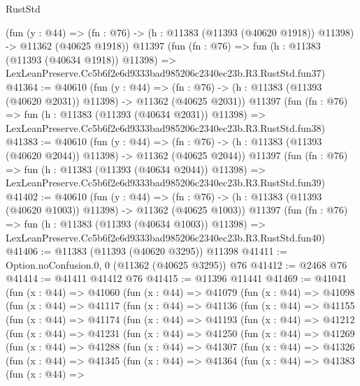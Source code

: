 \begin{lexlean}{RustStd}
\begin{coremodule}
    (fun (y : @44) =>
    (fn : @76) -> (h : @11383 (@11393 (@40620 @1918)) @11398) -> @11362 (@40625 @1918))
    @11397
    (fun (fn : @76) =>
    fun (h : @11383 (@11393 (@40634 @1918)) @11398) =>
    LexLeanPreserve.Cc5b6f2e6d9333bad985206c2340ec23b.R3.RustStd.fun37)
@41364 := @40610
    (fun (y : @44) =>
    (fn : @76) -> (h : @11383 (@11393 (@40620 @2031)) @11398) -> @11362 (@40625 @2031))
    @11397
    (fun (fn : @76) =>
    fun (h : @11383 (@11393 (@40634 @2031)) @11398) =>
    LexLeanPreserve.Cc5b6f2e6d9333bad985206c2340ec23b.R3.RustStd.fun38)
@41383 := @40610
    (fun (y : @44) =>
    (fn : @76) -> (h : @11383 (@11393 (@40620 @2044)) @11398) -> @11362 (@40625 @2044))
    @11397
    (fun (fn : @76) =>
    fun (h : @11383 (@11393 (@40634 @2044)) @11398) =>
    LexLeanPreserve.Cc5b6f2e6d9333bad985206c2340ec23b.R3.RustStd.fun39)
@41402 := @40610
    (fun (y : @44) =>
    (fn : @76) -> (h : @11383 (@11393 (@40620 @1003)) @11398) -> @11362 (@40625 @1003))
    @11397
    (fun (fn : @76) =>
    fun (h : @11383 (@11393 (@40634 @1003)) @11398) =>
    LexLeanPreserve.Cc5b6f2e6d9333bad985206c2340ec23b.R3.RustStd.fun40)
@41406 := @11383 (@11393 (@40620 @3295)) @11398
@41411 := Option.noConfusion.{0, 0} (@11362 (@40625 @3295)) @76
@41412 := @2468 @76
@41414 := @41411 @41412 @76
@41415 := @11396 @11441
@41469 := @41041
    (fun (x : @44) =>
    @41060
      (fun (x : @44) =>
      @41079
        (fun (x : @44) =>
        @41098
          (fun (x : @44) =>
          @41117
            (fun (x : @44) =>
            @41136
              (fun (x : @44) =>
              @41155
                (fun (x : @44) =>
                @41174
                  (fun (x : @44) =>
                  @41193
                    (fun (x : @44) =>
                    @41212
                      (fun (x : @44) =>
                      @41231
                        (fun (x : @44) =>
                        @41250
                          (fun (x : @44) =>
                          @41269
                            (fun (x : @44) =>
                            @41288
                              (fun (x : @44) =>
                              @41307
                                (fun (x : @44) =>
                                @41326
                                  (fun (x : @44) =>
                                  @41345
                                    (fun (x : @44) =>
                                    @41364
                                      (fun (x : @44) =>
                                      @41383
                                        (fun (x : @44) =>

\end{coremodule}
\end{lexlean}
